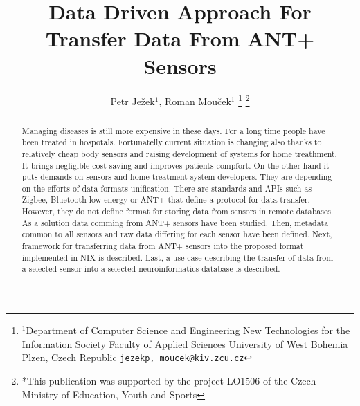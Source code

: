 \documentclass[conference]{IEEEconf}
\begin{document}
  \title{Data Driven Approach For Transfer Data  From ANT+ Sensors}

  \author{{Petr Je\v{z}ek$^{1}$, Roman Mou\v{c}ek$^{1}$}
\thanks{$^{1}$Department of Computer Science and Engineering
New Technologies for the Information Society
Faculty of Applied Sciences
University of West Bohemia
Plzen, Czech Republic
        {\tt\small {jezekp, moucek}@kiv.zcu.cz}}%
\thanks{*This publication was supported by the project LO1506 of the Czech Ministry of Education, Youth and Sports}%
}
\maketitle


\begin{abstract}
Managing diseases is still more expensive in these days. For a long time people have been treated in hospotals. Fortunatelly current situation is changing also thanks to relatively cheap body sensors and raising development of systems for home treathment. It brings negligible cost saving and improves patients compfort. On the other hand it puts demands on sensors and home treatment system developers. They are depending on the efforts of data formats unification. There are standards and APIs such as Zigbee, Bluetooth low energy or ANT+ that define a protocol for data transfer. However, they do not define format for storing data from sensors in remote databases. As a solution data comming from ANT+ sensors have been studied. Then, metadata common to all sensors and raw data differing for each sensor have been defined. Next, framework for transferring data from ANT+ sensors into the proposed format implemented in NIX is described. Last, a use-case describing the transfer of data from a selected sensor into a selected neuroinformatics database is described.
\end{abstract}
\end{document}
